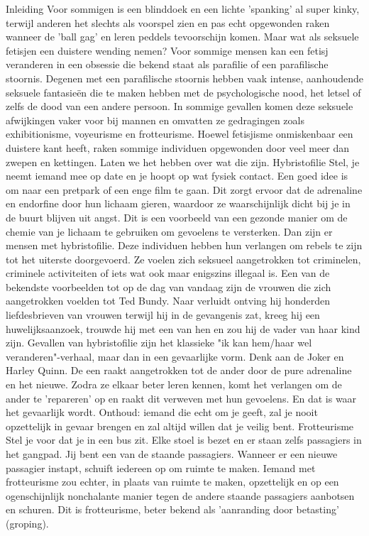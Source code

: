 Inleiding
Voor sommigen is een blinddoek en een lichte 'spanking' al super kinky, terwijl anderen het slechts als voorspel zien en pas echt opgewonden raken wanneer de 'ball gag' en leren peddels tevoorschijn komen. Maar wat als seksuele fetisjen een duistere wending nemen?
Voor sommige mensen kan een fetisj veranderen in een obsessie die bekend staat als parafilie of een parafilische stoornis. Degenen met een parafilische stoornis hebben vaak intense, aanhoudende seksuele fantasieën die te maken hebben met de psychologische nood, het letsel of zelfs de dood van een andere persoon. In sommige gevallen komen deze seksuele afwijkingen vaker voor bij mannen en omvatten ze gedragingen zoals exhibitionisme, voyeurisme en frotteurisme. Hoewel fetisjisme onmiskenbaar een duistere kant heeft, raken sommige individuen opgewonden door veel meer dan zwepen en kettingen. Laten we het hebben over wat die zijn.
Hybristofilie
Stel, je neemt iemand mee op date en je hoopt op wat fysiek contact. Een goed idee is om naar een pretpark of een enge film te gaan. Dit zorgt ervoor dat de adrenaline en endorfine door hun lichaam gieren, waardoor ze waarschijnlijk dicht bij je in de buurt blijven uit angst. Dit is een voorbeeld van een gezonde manier om de chemie van je lichaam te gebruiken om gevoelens te versterken.
Dan zijn er mensen met hybristofilie. Deze individuen hebben hun verlangen om rebels te zijn tot het uiterste doorgevoerd. Ze voelen zich seksueel aangetrokken tot criminelen, criminele activiteiten of iets wat ook maar enigszins illegaal is. Een van de bekendste voorbeelden tot op de dag van vandaag zijn de vrouwen die zich aangetrokken voelden tot Ted Bundy. Naar verluidt ontving hij honderden liefdesbrieven van vrouwen terwijl hij in de gevangenis zat, kreeg hij een huwelijksaanzoek, trouwde hij met een van hen en zou hij de vader van haar kind zijn.
Gevallen van hybristofilie zijn het klassieke "ik kan hem/haar wel veranderen"-verhaal, maar dan in een gevaarlijke vorm. Denk aan de Joker en Harley Quinn. De een raakt aangetrokken tot de ander door de pure adrenaline en het nieuwe. Zodra ze elkaar beter leren kennen, komt het verlangen om de ander te 'repareren' op en raakt dit verweven met hun gevoelens. En dat is waar het gevaarlijk wordt. Onthoud: iemand die echt om je geeft, zal je nooit opzettelijk in gevaar brengen en zal altijd willen dat je veilig bent.
Frotteurisme
Stel je voor dat je in een bus zit. Elke stoel is bezet en er staan zelfs passagiers in het gangpad. Jij bent een van de staande passagiers. Wanneer er een nieuwe passagier instapt, schuift iedereen op om ruimte te maken. Iemand met frotteurisme zou echter, in plaats van ruimte te maken, opzettelijk en op een ogenschijnlijk nonchalante manier tegen de andere staande passagiers aanbotsen en schuren. Dit is frotteurisme, beter bekend als 'aanranding door betasting' (groping).
